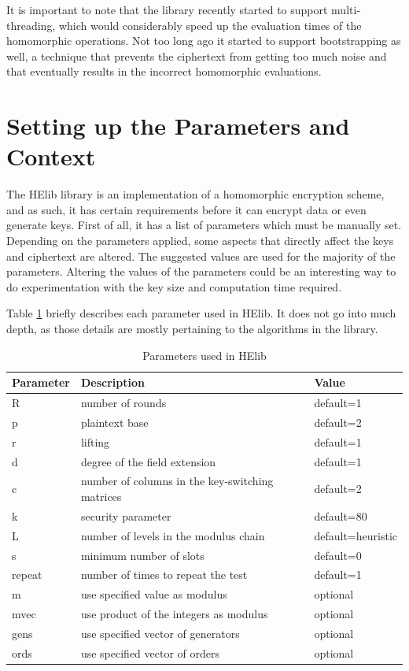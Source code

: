 It is important to note that the library recently started to support multi-threading, which would considerably speed up the evaluation times of the homomorphic operations. Not too long ago it started to support bootstrapping as well, a technique that prevents the ciphertext from getting too much noise and that eventually results in the incorrect homomorphic evaluations.

\section{Setting up the Parameters and Context}

The HElib library is an implementation of a homomorphic encryption scheme, and as such, it has certain requirements before it can encrypt data or even generate keys. First of all, it has a list of parameters which must be manually set. Depending on the parameters applied, some aspects that directly affect the keys and ciphertext are altered. The suggested values are used for the majority of the parameters. Altering the values of the parameters could be an interesting way to do experimentation with the key size and computation time required.

Table \ref{tbl:parameters} briefly describes each parameter used in HElib. It does not go into much depth, as those details are mostly pertaining to the algorithms in the library.

\begin{table}[h]
  \caption{Parameters used in HElib}
  \label{tbl:parameters}
\centering
  \begin{tabular}{|l|l|l|}
    \hline
    \textbf{Parameter} & \textbf{Description} & \textbf{Value} \\ \hline
    R  &     number of rounds &  default=1     \\ \hline
    p  &     plaintext base  & default=2  \\ \hline
    r  &     lifting  & default=1  \\ \hline
    d  &     degree of the field extension  & default=1  \\ \hline
    c  &     number of columns in the key-switching matrices  & default=2  \\ \hline
    k  &     security parameter & default=80  \\ \hline
    L  &     number of levels in the modulus chain  & default=heuristic  \\ \hline
    s  &     minimum number of slots  & default=0  \\ \hline
    repeat &  number of times to repeat the test & default=1  \\ \hline
    m   &    use specified value as modulus & optional  \\ \hline
    mvec &   use product of the integers as  modulus & optional \\ \hline
    gens &   use specified vector of generators & optional \\ \hline
    ords  &  use specified vector of orders & optional \\ \hline
  \end{tabular}
\end{table}


